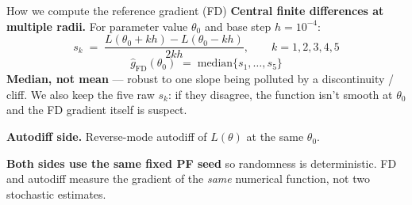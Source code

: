\documentclass[10pt,aspectratio=169]{beamer}
\begin{document}


\begin{frame}{How we compute the reference gradient (FD)}
  \textbf{Central finite differences at multiple radii.} For parameter value $\theta_0$ and base step $h = 10^{-4}$:
  \[
    s_k \;=\; \frac{L(\theta_0 + k h) - L(\theta_0 - k h)}{2 k h}, \qquad k = 1, 2, 3, 4, 5
  \]
  \[
    \widehat{g}_\text{FD}(\theta_0) \;=\; \mathrm{median}\{s_1, \dots, s_5\}
  \]
  \textbf{Median, not mean} --- robust to one slope being polluted by a discontinuity / cliff. We also keep the five raw $s_k$: if they disagree, the function isn't smooth at $\theta_0$ and the FD gradient itself is suspect.

  \medskip
  \textbf{Autodiff side.} Reverse-mode autodiff of $L(\theta)$ at the same $\theta_0$.

  \medskip
  \textbf{Both sides use the same fixed PF seed} so randomness is deterministic. FD and autodiff measure the gradient of the \emph{same} numerical function, not two stochastic estimates.
\end{frame}
\end{document}

